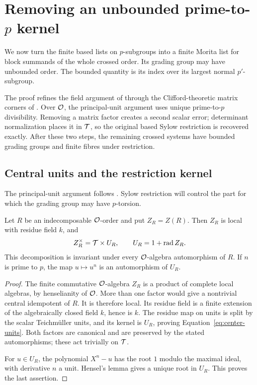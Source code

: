 \section{Removing an unbounded prime-to-\texorpdfstring{$p$}{p} kernel}\label{sec:kernel}

We now turn the finite based lists on $p$-subgroups into a finite
Morita list for block summands of the whole crossed order.  Its
grading group may have unbounded order.  The bounded quantity is
its index over its largest normal $p'$-subgroup.

The proof refines the field argument of
\cite[Lemma~8.7]{OpenAIFieldDonovan2026} through the
Clifford-theoretic matrix corners of
\cite{KulshammerClifford1990,Kulshammer1995}.  Over $\mathcal O$, the
principal-unit argument uses unique prime-to-$p$ divisibility.
Removing a matrix factor creates a second scalar error; determinant
normalization places it in $\mathcal T$, so the original based Sylow
restriction is recovered exactly.  After these two steps, the
remaining crossed systems have bounded grading groups and finite
fibres under restriction.

\subsection{Central units and the restriction kernel}

The principal-unit argument follows
\cite[Lemma~4.4]{EiseleReduction2021}.  Sylow restriction will control
the part for which the grading group may have $p$-torsion.

\begin{lemma}\label{lem:center-units}
Let $R$ be an indecomposable $\mathcal O$-order and put $Z_R=Z(R)$.
Then $Z_R$ is local with residue field $k$, and
\begin{equation}\label{eq:center-units}
 Z_R^\times=\mathcal T\times U_R,
 \qquad U_R=1+\operatorname{rad} Z_R.
\end{equation}
This decomposition is invariant under every $\mathcal O$-algebra
automorphism of $R$.  If $n$ is prime to $p$, the map
$u\mapsto u^n$ is an automorphism of $U_R$.
\end{lemma}

\begin{proof}
The finite commutative $\mathcal O$-algebra $Z_R$ is a product of
complete local algebras, by henselianity of $\mathcal O$.  More than
one factor would give a nontrivial central idempotent of $R$.
It is therefore local.  Its residue field is a finite extension
of the algebraically closed field $k$, hence is $k$.
The residue map on units is split by the scalar Teichm\"uller
units, and its kernel is $U_R$, proving
Equation~\eqref{eq:center-units}.  Both factors are canonical
and are preserved by the stated automorphisms; these act
trivially on $\mathcal T$.

For $u\in U_R$, the polynomial $X^n-u$ has the root $1$ modulo
the maximal ideal, with derivative $n$ a unit.  Hensel's lemma
gives a unique root in $U_R$.  This proves the last assertion.
\end{proof}

